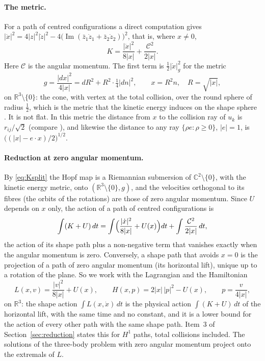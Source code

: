 \documentclass[11pt]{article}
\theoremstyle{definition}
\begin{document}
\paragraph{The metric.} For a path of centred configurations a direct computation gives
$|\dot x|^2=4|z|^2|\dot z|^2-4\bigl(\operatorname{Im}(\bar z_1\dot z_1+\bar z_2\dot z_2)\bigr)^2$, that is, where
$x\ne0$,
\begin{equation}\label{eq:Ksplit}
  K=\frac{|\dot x|^2}{8|x|}+\frac{\mathcal C^2}{2|x|}.
\end{equation}
Here $\mathcal C$ is the angular momentum. The first term is $\tfrac12|\dot x|_g^2$ for
the metric
\[
  g=\frac{|dx|^2}{4|x|}=dR^2+R^2\cdot\tfrac14|dn|^2,\qquad x=R^2n,\quad R=\sqrt{|x|},
\]
on $\mathbb R^3\setminus\{0\}$: the cone, with vertex at the total collision, over the round sphere of radius
$\tfrac12$, which is the metric that the kinetic energy induces on the shape sphere \cite{CM,Mpants}. It is not flat.
In this metric the distance from $x$ to the collision ray of $u_k$ is $r_{ij}/\sqrt2$ (compare \cite[\S3]{Mpants}),
and likewise the distance to any ray $\{\rho e:\rho\ge0\}$, $|e|=1$, is $\bigl((|x|-e\cdot x)/2\bigr)^{1/2}$.

\paragraph{Reduction at zero angular momentum.} By \eqref{eq:Ksplit} the Hopf map is a Riemannian submersion of
$\mathbb C^2\setminus\{0\}$, with the kinetic energy metric, onto $(\mathbb R^3\setminus\{0\},g)$, and the velocities
orthogonal to its fibres (the orbits of the rotations) are those of zero angular momentum. Since $U$ depends on $x$
only, the action of a path of centred configurations is
\[
  \int(K+U)\,dt=\int\Bigl(\frac{|\dot x|^2}{8|x|}+U(x)\Bigr)dt+\int\frac{\mathcal C^2}{2|x|}\,dt ,
\]
the action of its shape path plus a non-negative term that vanishes exactly when the angular momentum is zero.
Conversely, a shape path that avoids $x=0$ is the projection of a path of zero angular momentum (its horizontal
lift), unique up to a rotation of the plane. So we work with the Lagrangian and the Hamiltonian
\[
  L(x,v)=\frac{|v|^2}{8|x|}+U(x),\qquad H(x,p)=2|x|\,|p|^2-U(x),\qquad p=\frac{v}{4|x|},
\]
on $\mathbb R^3$: the shape action $\int L(x,\dot x)\,dt$ is the physical action $\int(K+U)\,dt$ of the horizontal lift,
with the same time and no constant, and it is a lower bound for the action of every other path with the same
shape path. Item~3 of Section~\ref{sec:reduction} states this for $H^1$ paths, total collisions included. The
solutions of the three-body problem with zero angular momentum project onto the extremals of $L$.
\end{document}
